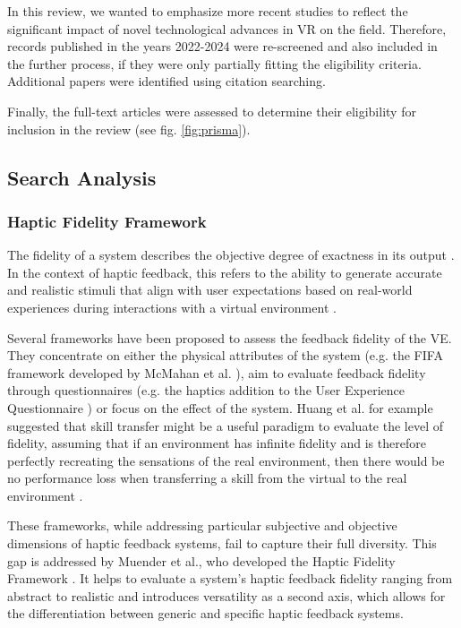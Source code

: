 In this review, we wanted to emphasize more recent studies to reflect the significant impact of novel technological advances in VR on the field. Therefore, records published in the years 2022-2024 were re-screened and also included in the further process, if they were only partially fitting the eligibility criteria. Additional papers were identified using citation searching.

Finally, the full-text articles were assessed to determine their eligibility for inclusion in the review (see fig. \ref{fig:prisma}).


\subsection{Search Analysis}
\subsubsection{Haptic Fidelity Framework}


The fidelity of a system describes the objective degree of exactness in its output \cite{McMahan2011ExploringGames}. 
In the context of haptic feedback, this refers to the ability to generate accurate and realistic stimuli that align with user expectations based on real-world experiences during interactions with a virtual environment \cite{Muender2022HapticReality}. 

Several frameworks have been proposed to assess the feedback fidelity of the VE. They concentrate on either the physical attributes of the system (e.g. the FIFA framework developed by McMahan et al. \cite{McMahan2011ExploringGames}), aim to evaluate feedback fidelity through questionnaires (e.g. the haptics addition \cite{Boos2017ErweiterungHaptik} to the User Experience Questionnaire \cite{Laugwitz2008ConstructionQuestionnaire}) or focus on the effect of the system. Huang et al. for example suggested that skill transfer might be a useful paradigm to evaluate the level of fidelity, assuming that if an environment has infinite fidelity and is therefore perfectly recreating the sensations of the real environment, then there would be no performance loss when transferring a skill from the virtual to the real environment \cite{Huang2006}.

These frameworks, while addressing particular subjective and objective dimensions of haptic feedback systems, fail to capture their full diversity. This gap is addressed by Muender et al., who developed the Haptic Fidelity Framework \cite{Muender2022HapticReality}. It helps to evaluate a system's haptic feedback fidelity ranging from abstract to realistic and introduces versatility as a second axis, which allows for the differentiation between generic and specific haptic feedback systems. 


